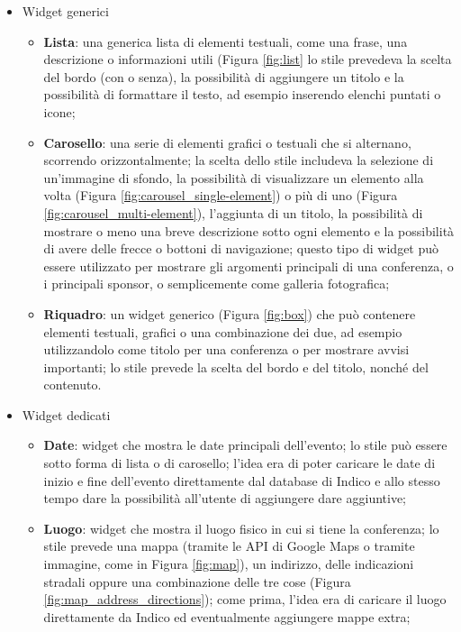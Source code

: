         \begin{itemize}
            \item Widget generici
                \begin{itemize}
                    \item \textbf{Lista}: una generica lista di elementi testuali, come una frase, una descrizione o informazioni utili (Figura \ref{fig:list} lo stile prevedeva la scelta del bordo (con o senza), la possibilità di aggiungere un titolo e la possibilità di formattare il testo, ad esempio inserendo elenchi puntati o icone;
                    \item \textbf{Carosello}: una serie di elementi grafici o testuali che si alternano, scorrendo orizzontalmente; la scelta dello stile includeva la selezione di un'immagine di sfondo, la possibilità di visualizzare un elemento alla volta (Figura \ref{fig:carousel_single-element}) o più di uno (Figura \ref{fig:carousel_multi-element}), l'aggiunta di un titolo, la possibilità di mostrare o meno una breve descrizione sotto ogni elemento e la possibilità di avere delle frecce o bottoni di navigazione; questo tipo di widget può essere utilizzato per mostrare gli argomenti principali di una conferenza, o i principali sponsor, o semplicemente come galleria fotografica;
                    \item \textbf{Riquadro}: un widget generico (Figura \ref{fig:box}) che può contenere elementi testuali, grafici o una combinazione dei due, ad esempio utilizzandolo come titolo per una conferenza o per mostrare avvisi importanti; lo stile prevede la scelta del bordo e del titolo, nonché del contenuto.
                \end{itemize}
            \item Widget dedicati
                \begin{itemize}
                    \item \textbf{Date}: widget che mostra le date principali dell'evento; lo stile può essere sotto forma di lista o di carosello; l'idea era di poter caricare le date di inizio e fine dell'evento direttamente dal database di Indico e allo stesso tempo dare la possibilità all'utente di aggiungere dare aggiuntive;
                    \item \textbf{Luogo}: widget che mostra il luogo fisico in cui si tiene la conferenza; lo stile prevede una mappa (tramite le \ac{API} di Google Maps o tramite immagine, come in Figura \ref{fig:map}), un indirizzo, delle indicazioni stradali oppure una combinazione delle tre cose (Figura \ref{fig:map_address_directions}); come prima, l'idea era di caricare il luogo direttamente da Indico ed eventualmente aggiungere mappe extra;

\end{itemize}
\end{itemize}
